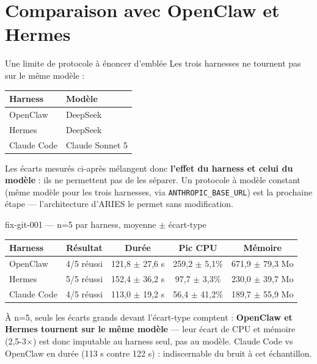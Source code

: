 \documentclass[aspectratio=169]{beamer}
\begin{document}
\section{Comparaison avec OpenClaw et Hermes}

\begin{frame}{Une limite de protocole à énoncer d'emblée}
Les trois harnesses ne tournent pas sur le même modèle :

\vspace{0.3cm}
\begin{center}
\renewcommand{\arraystretch}{1.3}
\begin{tabular}{ll}
\toprule
Harness & Modèle \\
\midrule
OpenClaw    & DeepSeek \\
Hermes      & DeepSeek \\
Claude Code & Claude Sonnet 5 \\
\bottomrule
\end{tabular}
\end{center}

\vspace{0.4cm}
Les écarts mesurés ci-après mélangent donc \textbf{l'effet du harness et
celui du modèle} : ils ne permettent pas de les séparer. Un protocole à
modèle constant (même modèle pour les trois harnesses, via
\texttt{ANTHROPIC\_BASE\_URL}) est la prochaine étape --- l'architecture
d'ARIES le permet sans modification.
\end{frame}

\begin{frame}{fix-git-001 --- n=5 par harness, moyenne $\pm$ écart-type}
\begin{center}
\renewcommand{\arraystretch}{1.3}
\begin{tabular}{lcccc}
\toprule
Harness & Résultat & Durée & Pic CPU & Mémoire \\
\midrule
OpenClaw     & 4/5 réussi & 121,8 $\pm$ 27,6 s & 259,2 $\pm$ 5,1\%  & 671,9 $\pm$ 79,3 Mo \\
Hermes       & 5/5 réussi & 152,4 $\pm$ 36,2 s & 97,7 $\pm$ 3,3\%   & 230,0 $\pm$ 39,7 Mo \\
Claude Code  & 4/5 réussi & 113,0 $\pm$ 19,2 s & 56,4 $\pm$ 41,2\%  & 189,7 $\pm$ 55,9 Mo \\
\bottomrule
\end{tabular}
\end{center}

\vspace{0.4cm}
À n=5, seuls les écarts grands devant l'écart-type comptent :
\textbf{OpenClaw et Hermes tournent sur le même modèle} --- leur écart de CPU
et mémoire (2,5-3$\times$) est donc imputable au harness seul, pas au modèle.
Claude Code vs OpenClaw en durée (113 s contre 122 s) : indiscernable du
bruit à cet échantillon.
\end{frame}
\end{document}
